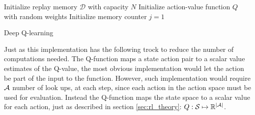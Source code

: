 \begin{algorithm}[H]
\SetAlgoLined
 Initialize replay memory $\mathcal{D}$ with capacity $N$\;
 Initialize action-value function $Q$ with random weights\;
 Initialize memory counter $j=1$\;
\caption{Deep Q-learning}
\label{alg:dqlearning}
\end{algorithm}

Just as \textcite{mnih_playing_2013} this implementation has the following trock to reduce the number of computations needed. The Q-function maps a state action pair to a scalar value estimates of the Q-value, the most obvious implementation would let the action be part of the input to the function. However, such implementation would require $\mathcal{A}$ number of look ups, at each step, since each action in the action space must be used for evaluation. Instead the Q-function maps the state space to a scalar value for each action, just as described in section \ref{sec:rl_theory}: $Q: \mathcal{S} \mapsto \mathbb{R}^{\mid \mathcal{A} \mid}$. 

